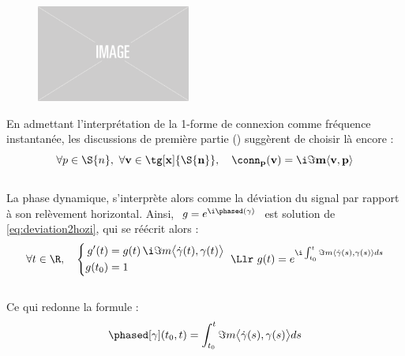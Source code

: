 \begin{figure}[h]
\begin{floatrow}		
	{\includegraphics[width=0.45\textwidth]{fig/placeholder}}
	
\end{floatrow}
\end{figure}

En admettant l'interprétation de la 1-forme de connexion comme fréquence instantanée, les discussions de première partie () suggèrent de choisir là encore :
\begin{equation} \label{eq:conn2SUPC}
\forall p\in\S{n},\ \forall \bf{v}\in\tg[x]{\S{n}},\quad \conn_p(\bf{v}) = \i\Im m \langle \bf{v}, p\rangle
\end{equation}
\\
La phase dynamique, s'interprète alors comme la déviation du signal par rapport à son relèvement horizontal. Ainsi, $\ g = e^{\i \phased(\gamma)}\ $ est solution de \eqref{eq:deviation2hozi}, qui se réécrit alors :
\[\forall t\in\R,\quad \left\{ \begin{aligned}
g'(t)  &= g(t)\, \i\Im m \big\langle \dot{\gamma}(t) , \gamma(t) \big\rangle \\
g(t_0) &= 1
\end{aligned}\ \right. \Llr\ g(t) = e^{\i  \int_{t_0}^t \Im m\langle \dot{\gamma}(s) , \gamma(s) \rangle ds}\]
\\
Ce qui redonne la formule :
\begin{equation}\label{eq:phased_vgeodiff}
\phased[\gamma](t_0, t) = \int_{t_0}^t \Im m\big\langle \dot{\gamma}(s) , \gamma(s) \big\rangle ds
\end{equation}
\skipl

